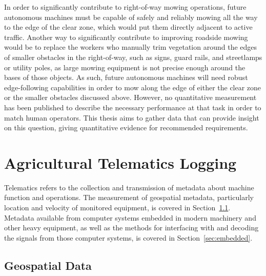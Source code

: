 \documentclass[
]{article}
\begin{document}
In order to significantly contribute to right-of-way mowing operations,
future autonomous machines must be capable of safely and reliably mowing
all the way to the edge of the clear zone, which would put them directly
adjacent to active traffic. Another way to significantly contribute to
improving roadside mowing would be to replace the workers who manually
trim vegetation around the edges of smaller obstacles in the
right-of-way, such as signs, guard rails, and streetlamps or utility
poles, as large mowing equipment is not precise enough around the bases
of those objects. As such, future autonomous machines will need robust
edge-following capabilities in order to mow along the edge of either the
clear zone or the smaller obstacles discussed above. However, no
quantitative measurement has been published to describe the necessary
performance at that task in order to match human operators. This thesis
aims to gather data that can provide insight on this question, giving
quantitative evidence for recommended requirements.

\section{Agricultural Telematics Logging}\label{sec:telematics}

Telematics refers to the collection and transmission of metadata about
machine function and operations. The measurement of geospatial metadata,
particularly location and velocity of monitored equipment, is covered in
Section~\ref{sec:GIS}. Metadata available from computer systems embedded
in modern machinery and other heavy equipment, as well as the methods
for interfacing with and decoding the signals from those computer
systems, is covered in Section~\ref{sec:embedded}.

\subsection{Geospatial Data}\label{sec:GIS}
\end{document}

